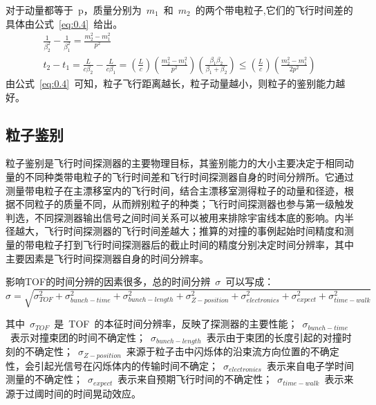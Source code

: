 
对于动量都等于~p，质量分别为~$m_{1}$~和~$m_{2}$~的两个带电粒子,它们的飞行时间差的具体由公式~\ref{eq:0.4}~给出。
\begin{align}
\frac{1}{\beta^{2}_{2}}-\frac{1}{\beta^{2}_{1}}=\frac{m^{2}_{2}-m^{2}_{1}}{p^{2}}
\label{eq:0.3}\\
t_{2}-t_{1}=\frac{L}{c\beta_{2}}-\frac{L}{c\beta_{1}}=(\frac{L}{c})(\frac{m^{2}_{2}-m^{2}_{1}}{p^{2}})(\frac{\beta_{1}\beta_{2}}{\beta_{1}+\beta_{2}})\leq(\frac{L}{c})(\frac{m^{2}_{2}-m^{2}_{1}}{2p^{2}})
\label{eq:0.4}
\end{align}
由公式~\ref{eq:0.4}~可知，粒子飞行距离越长，粒子动量越小，则粒子的鉴别能力越好。

\subsection{粒子鉴别}
粒子鉴别是飞行时间探测器的主要物理目标，其鉴别能力的大小主要决定于相同动量的不同种类带电粒子的飞行时间差和飞行时间探测器自身的时间分辨所。它通过测量带电粒子在主漂移室内的飞行时间，结合主漂移室测得粒子的动量和径迹，根据不同粒子的质量不同，从而辨别粒子的种类；飞行时间探测器也参与第一级触发判选，不同探测器输出信号之间时间关系可以被用来排除宇宙线本底的影响。内半径越大，飞行时间探测器的飞行时间差越大；推算的对撞的事例起始时间精度和测量的带电粒子打到飞行时间探测器后的截止时间的精度分别决定时间分辨率，其中主要因素是飞行时间探测器自身的时间分辨率。

影响TOF的时间分辨的因素很多，总的时间分辨~$\sigma$~可以写成：
\begin{displaymath}
\sigma=\sqrt{\sigma_{TOF}^{2}+\sigma_{bunch-time}^{2}+\sigma_{bunch-length}^{2}+\sigma_{Z-position}^{2}+\sigma_{electronics}^{2}+\sigma_{expect}^{2}+\sigma_{time-walk}^{2}}
\end{displaymath}

其中~$\sigma_{TOF}$~是~TOF~的本征时间分辨率，反映了探测器的主要性能；~$\sigma_{bunch-time}$~表示对撞束团的时间不确定性；~$\sigma_{bunch-length}$~表示由于束团的长度引起的对撞时刻的不确定性；~$\sigma_{Z-position}$~来源于粒子击中闪烁体的沿束流方向位置的不确定性，会引起光信号在闪烁体内的传输时间不确定；~$\sigma_{electronics}$~表示来自电子学时间测量的不确定性；~$\sigma_{expect}$~表示来自预期飞行时间的不确定性；~$\sigma_{time-walk}$~表示来源于过阈时间的时间晃动效应。

